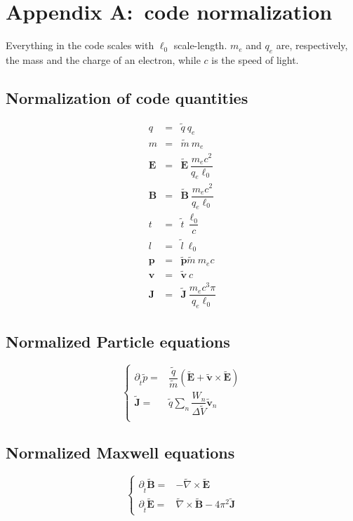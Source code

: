 \documentclass[11pt,a4paper]{report}
\begin{document}
\chapter*{Appendix A:\ code normalization}
Everything in the code scales with $\ell_0$ scale-length.
$m_e$ and $q_e$ are, respectively, the mass and the charge of an electron, while $c$ is the speed of light.

\section*{Normalization of code quantities}
\begin{eqnarray*}
q          &=& \widetilde{q}                        \: q_e                              \\
m          &=& \widetilde{m}                        \: m_e                              \\
\mathbf{E} &=& \widetilde{\mathbf{E}}               \: \dfrac{m_e c^2}{q_e \ell_0}      \\
\mathbf{B} &=& \widetilde{\mathbf{B}}               \: \dfrac{m_e c^2}{q_e \ell_0}      \\
t          &=& \widetilde{t}                        \: \dfrac{\ell_0}{c}                \\
l          &=& \widetilde{l}                        \: \ell_0                           \\
\mathbf{p} &=& \widetilde{\mathbf{p}} \widetilde{m} \: m_e c                            \\
\mathbf{v} &=& \widetilde{\mathbf{v}}               \: c                                \\
\mathbf{J} &=& \widetilde{\mathbf{J}}               \: \dfrac{m_e c^3 \pi}{q_e \ell_0}
\end{eqnarray*}

\section*{Normalized Particle equations}
\[
\begin{cases}
    \partial_{\widetilde{t}} \widetilde{p} = & \dfrac{\widetilde{q}}{\widetilde{m}} \left({\widetilde{\mathbf{E}} + \widetilde{\mathbf{v}} \times \widetilde{\mathbf{E}}}\right) \\
   \widetilde{\mathbf{J}} = & \widetilde{q} \sum_n{\dfrac{W_n}{\Delta \widetilde{V}} \widetilde{\mathbf{v}}_n} \\
\end{cases}
\]

\section*{Normalized Maxwell equations}
\[
\begin{cases}
    \partial_{\widetilde{t}} \widetilde{\mathbf{B}} = & - \widetilde{\nabla} \times \widetilde{\mathbf{E}} \\
    \partial_{\widetilde{t}} \widetilde{\mathbf{E}} = & \widetilde{\nabla} \times \widetilde{\mathbf{B}} - 4\pi^2 \widetilde{\mathbf{J}}
\end{cases}
\]
\end{document}
